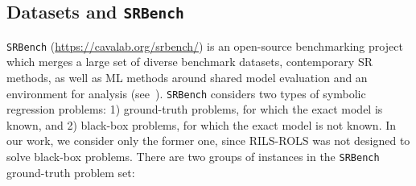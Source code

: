 \documentclass{bmcart}
\begin{document}
\subsection{Datasets and \texttt{SRBench}}

\texttt{SRBench} (\url{https://cavalab.org/srbench/}) is an open-source benchmarking project which merges a large set of diverse benchmark datasets, contemporary SR methods, as well as ML methods around shared model evaluation and an environment for analysis (see~\cite{la2021contemporary}). \texttt{SRBench} considers two types of symbolic regression problems: 1) ground-truth problems, for which the exact model is known, and 2) black-box problems, for which the exact model is not known. In our work, we consider only the former one, since \textsc{RILS-ROLS} was not designed to solve black-box problems. There are two groups of instances in the \texttt{SRBench} ground-truth problem set:
\end{document}
